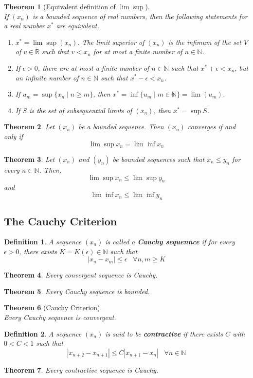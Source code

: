 \documentclass[12pt]{article}
\newtheorem{definition}{Definition}[section]
\newtheorem{theorem}{Theorem}[section]
\theoremstyle{definition}
\begin{document}
\begin{theorem}[Equivalent definition of $\lim\sup$]
\hfill\\\normalfont 
If $(x_n)$ is a bounded sequence of real numbers, then the following statements for a real number $x^\ast$ are equivalent.
\begin{enumerate}
\item $x^\ast = \lim\sup (x_n)$. The limit superior of $(x_n)$ is the infimum of the set $V$ of $v\in\mathbb{R}$ such that $v<x_n$ for at most a finite number of $n\in\mathbb{N}$.
\item If $\epsilon>0$, there are at most a finite number of $n\in\mathbb{N}$ such that $x^\ast+\epsilon<x_n$, but an infinite number of $n\in\mathbb{N}$ such that $x^\ast-\epsilon<x_n$.
\item If $u_m=\sup\{x_n\mid n\geq m\}$, then $x^\ast = \inf \{u_m\mid m\in\mathbb{N}\} = \lim(u_m)$.
\item If $S$ is the set of subsequential limits of $(x_n)$, then $x^\ast = \sup S$.
\end{enumerate}
\end{theorem}
\begin{theorem} \normalfont Let $(x_n)$ be a bounded sequence. Then $(x_n)$ converges if and only if
\[
\lim\sup x_n=\lim\inf x_n
\]
\end{theorem}
\begin{theorem}\normalfont Let $(x_n)$ and $(y_n)$ be bounded sequences such that $x_n\leq y_n$ for every $n\in\mathbb{N}$. Then,
\[
\lim\sup x_n\leq \lim\sup y_n
\]
and
\[
\lim\inf x_n\leq \lim\inf y_n
\]
\end{theorem}
\subsection{The Cauchy Criterion}
\begin{definition}\normalfont A sequence $(x_n)$ is called a \textbf{Cauchy sequennce} if for every $\epsilon>0$, there exists $K=K(\epsilon)\in\mathbb{N}$ such that
\[
|x_n-x_m|\leq \epsilon \;\;\;\forall n,m\geq K
\]
\end{definition}
\begin{theorem}\normalfont Every convergent sequence is Cauchy.
\end{theorem}
\begin{theorem}\normalfont Every Cauchy sequence is bounded.
\end{theorem}
\begin{theorem}[Cauchy Criterion]
\hfill\\\normalfont Every Cauchy sequence is convergent.
\end{theorem}
\begin{definition}\normalfont A sequence $(x_n)$ is said to be \textbf{contractive} if there exists $C$ with $0<C<1$ such that
\[
|x_{n+2}-x_{n+1}|\leq C|x_{n+1}-x_n|\;\;\;\forall n\in\mathbb{N}
\]
\end{definition}
\begin{theorem}\normalfont Every contractive sequence is Cauchy.
\end{theorem}
\end{document}
